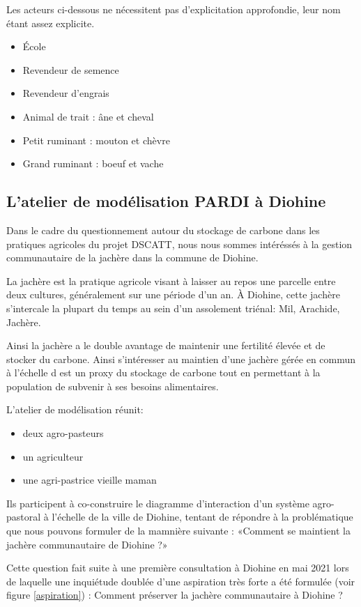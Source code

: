Les acteurs ci-dessous ne nécessitent pas d'explicitation approfondie, leur nom étant assez explicite.

\begin{itemize}
\item École
\item Revendeur de semence
\item Revendeur d'engrais
\item Animal de trait : âne et cheval
\item Petit ruminant : mouton et chèvre
\item Grand ruminant : boeuf et vache
\end{itemize}

\subsection{L'atelier de modélisation PARDI à Diohine }

Dans le cadre du questionnement autour du stockage de carbone dans les pratiques agricoles du projet DSCATT, nous nous sommes intéréssés à la gestion communautaire de la jachère dans la commune de Diohine.

La jachère est la pratique agricole visant à laisser au repos une parcelle entre deux cultures, généralement sur une période d'un an. À Diohine, cette jachère s'intercale la plupart du temps au sein d'un assolement triénal: Mil, Arachide, Jachère.

Ainsi la jachère a le double avantage de maintenir une fertilité élevée et de stocker du carbone. Ainsi s'intéresser au maintien d'une jachère gérée en commun à l'échelle d est un proxy du stockage de carbone tout en permettant à la population de subvenir à ses besoins alimentaires.

L'atelier de modélisation réunit:
\begin{itemize}
  \item deux agro-pasteurs
  \item un agriculteur
  \item une agri-pastrice vieille maman
\end{itemize}

Ils participent à co-construire le diagramme d'interaction d'un système agro-pastoral à l'échelle de la ville de Diohine, tentant de répondre à la problématique que nous pouvons formuler de la mamnière suivante : «Comment se maintient la jachère communautaire de Diohine ?»

Cette question fait suite à une première consultation à Diohine en mai 2021 lors de laquelle une inquiétude doublée d'une aspiration très forte a été formulée (voir figure \ref{aspiration}) : Comment préserver la jachère communautaire à Diohine ?\cite{perrotton_definition_2021}

